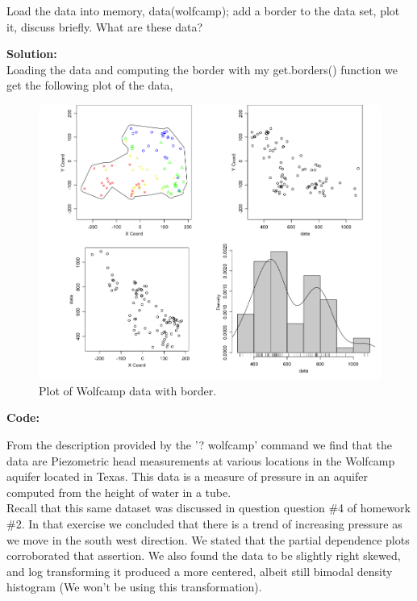 \documentclass[12pt]{article}
\makeatletter
\theoremstyle{homework}
\newenvironment{exercise}[1]
{\def\@currentlabel{#1}\exercisecore}
{\endexercisecore}
\newcommand{\localhead}[1]{\par\smallskip\noindent\textbf{#1}\nobreak\\}%
\newcommand\solution{\localhead{Solution:}}
\makeatother
\begin{document}
\begin{exercise}{1} Load the data into memory, data(wolfcamp); add a border to 
  the data set, plot it, discuss briefly. What are these data?\\
  \solution Loading the data and computing the border with my get.borders() 
  function we get the following plot of the data, 
  \begin{figure}[H]
    \begin{center}
      \caption{Plot of Wolfcamp data with border.}
    \includegraphics[width = \textwidth]{Rplot.png}
    \end{center}
  \end{figure}
    \textbf{Code:}
    \begin{center}
    
    \end{center}
      From the description provided by the '? wolfcamp' command we find that the data are 
    Piezometric head measurements at various locations in the Wolfcamp aquifer located in Texas. 
    This data is a measure of pressure in an aquifer computed from the height of water in a tube.\\

    Recall that this same dataset was discussed in question question \#4 of homework \#2. In that exercise
    we concluded that there is a trend of increasing pressure as we move in the south west direction. We stated that the 
    partial dependence plots corroborated that assertion. We also found the data to be slightly right skewed, and log transforming it 
    produced a more centered, albeit still bimodal density histogram (We won't be using this transformation). 
    

\end{exercise}
\end{document}
